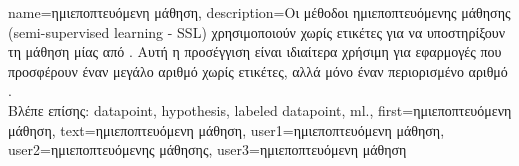{name={\foreignlanguage{greek}{ημιεποπτευόμενη μάθηση}}, 
	description={\foreignlanguage{greek}{Οι μέθοδοι ημιεποπτευόμενης μάθησης} 
		(semi-supervised learning - SSL) \foreignlanguage{greek}{χρησιμοποιούν}  \foreignlanguage{greek}{χωρίς 
		ετικέτες για να υποστηρίξουν τη μάθηση μίας}  \foreignlanguage{greek}{από}  
		\cite{SemiSupervisedBook}. \foreignlanguage{greek}{Αυτή η προσέγγιση είναι ιδιαίτερα χρήσιμη για εφαρμογές}  
		\foreignlanguage{greek}{που προσφέρουν έναν μεγάλο αριθμό}  \foreignlanguage{greek}{χωρίς ετικέτες, 
		αλλά μόνο έναν περιορισμένο αριθμό} .
			\\
		\foreignlanguage{greek}{Βλέπε επίσης:} \gls{datapoint}, \gls{hypothesis}, \gls{labeled datapoint}, \gls{ml}.}, 
	first={\foreignlanguage{greek}{ημιεποπτευόμενη μάθηση}},
	text={\foreignlanguage{greek}{ημιεποπτευόμενη μάθηση}},
	user1={\foreignlanguage{greek}{ημιεποπτευόμενη μάθηση}}, %
  	user2={\foreignlanguage{greek}{ημιεποπτευόμενης μάθησης}}, %
	user3={\foreignlanguage{greek}{ημιεποπτευόμενη μάθηση}} %
}

